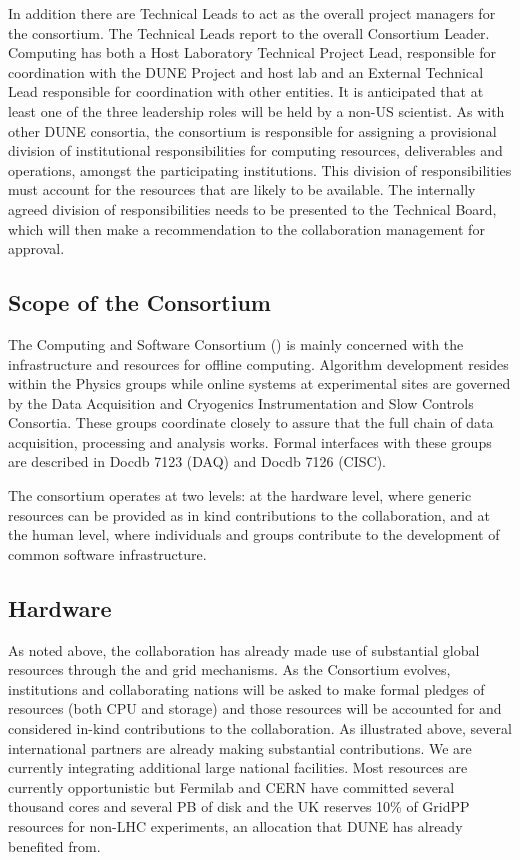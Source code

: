 In addition there  are Technical Leads to act as the overall project managers for the consortium. The Technical Leads report to the overall Consortium Leader.
Computing has both a Host Laboratory Technical Project Lead, responsible for coordination with the DUNE Project and host lab and an External Technical Lead responsible for coordination with other entities.
It is anticipated that at least one of the three leadership roles will be held by a non-US scientist. 
As with other DUNE consortia, the consortium is responsible for assigning a provisional division of institutional
responsibilities for computing resources, deliverables and operations, amongst the participating institutions. This division of responsibilities must account for the resources that are likely to be available. The internally agreed division of responsibilities needs to be presented to the Technical Board, which will then make a recommendation to the collaboration management for approval.



\subsection{Scope of the Consortium}
The Computing and Software Consortium () is mainly concerned with the infrastructure and resources for offline computing.  Algorithm development resides within the Physics groups while online systems at experimental sites are governed by the Data Acquisition and Cryogenics Instrumentation and Slow Controls Consortia. These groups coordinate closely to assure that the full chain of data acquisition, processing and analysis works. Formal interfaces with these groups are described in Docdb 7123 (DAQ) and Docdb 7126 (CISC).

The consortium operates at two levels: at the hardware level, where generic resources can be provided as in kind contributions to the collaboration, and at the human level, where individuals and groups contribute to the development of common software infrastructure. 

\subsection{Hardware}
As noted above, the collaboration has already made use of substantial global resources through the  and  grid mechanisms. As the Consortium evolves, institutions and collaborating nations will be asked to make formal pledges of resources (both CPU and storage) and those resources will be accounted for and considered in-kind contributions to the collaboration.
As illustrated above, several international partners are already making substantial contributions. We are currently integrating additional large national facilities. Most resources are currently opportunistic but Fermilab and CERN have committed several thousand cores and several PB of disk and the UK reserves 10\% of GridPP resources for non-LHC experiments, an allocation that DUNE has already benefited from.

